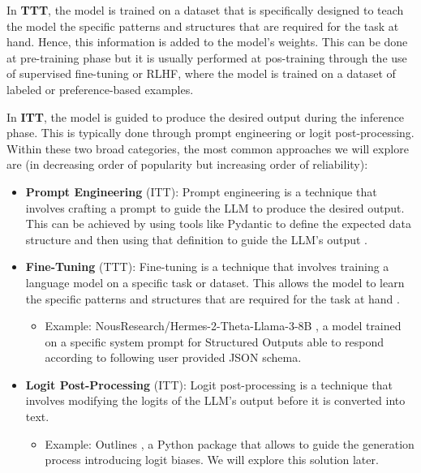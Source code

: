 In \textbf{TTT}, the model is trained on a dataset that is specifically designed to teach the model the specific patterns and structures that are required for the task at hand. Hence, this information is added to the model's weights. This can be done at pre-training phase but it is usually performed at pos-training through the use of supervised fine-tuning or RLHF, where the model is trained on a dataset of labeled or preference-based examples.

In \textbf{ITT}, the model is guided to produce the desired output during the inference phase. This is typically done through prompt engineering or logit post-processing.
Within these two broad categories, the most common approaches we will explore are (in decreasing order of popularity but increasing order of reliability):

\begin{itemize}
    \item \textbf{Prompt Engineering} (ITT): Prompt engineering is a technique that involves crafting a prompt to guide the LLM to produce the desired output. This can be achieved by using tools like Pydantic to define the expected data structure and then using that definition to guide the LLM's output .

    \item \textbf{Fine-Tuning} (TTT): Fine-tuning is a technique that involves training a language model on a specific task or dataset. This allows the model to learn the specific patterns and structures that are required for the task at hand .
    \begin{itemize}
        \item Example: NousResearch/Hermes-2-Theta-Llama-3-8B , a model trained on a specific system prompt for Structured Outputs able to respond according to following user provided JSON schema.
    \end{itemize}

    \item \textbf{Logit Post-Processing} (ITT): Logit post-processing is a technique that involves modifying the logits of the LLM's output before it is converted into text.
    \begin{itemize}
        \item Example: Outlines , a Python package that allows to guide the generation process introducing logit biases. We will explore this solution later.
    \end{itemize}
\end{itemize}

